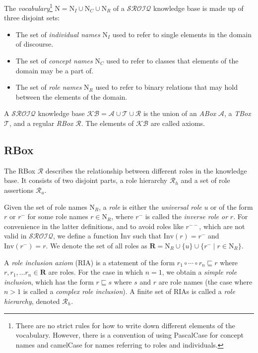 
The \emph{vocabulary}\footnote{There are no strict rules for how to write down different elements of the vocabulary. However, there is a convention of using PascalCase for concept names and camelCase for names referring to roles and individuals.} $\mathrm{N} = \mathrm{N}_I \cup \mathrm{N}_C \cup \mathrm{N}_R$ of a $\mathcal{SROIQ}$ knowledge base is made up of three disjoint sets:

\begin{itemize}
    \item The set of \emph{individual names} $\mathrm{N}_I$ used to refer to single elements in the domain of discourse.
    \item The set of \emph{concept names} $\mathrm{N}_C$ used to refer to classes that elements of the domain may be a part of.
    \item The set of \emph{role names} $\mathrm{N}_R$ used to refer to binary relations that may hold between the elements of the domain.
\end{itemize}

A $\mathcal{SROIQ}$ knowledge base $\mathcal{KB} = \mathcal{A} \cup \mathcal{T} \cup \mathcal{R}$ is the union of an \emph{ABox} $\mathcal{A}$, a \emph{TBox} $\mathcal{T}$, and a regular \emph{RBox} $\mathcal{R}$. The elements of $\mathcal{KB}$ are called axioms.

\subsection{RBox} \label{rbox}

The RBox $\mathcal{R}$ describes the relationship between different roles in the knowledge base. It consists of two disjoint parts, a role hierarchy $\mathcal{R}_h$ and a set of role assertions $\mathcal{R}_a$.

Given the set of role names $\mathrm{N}_R$, a \emph{role} is either the \emph{universal role} $u$ or of the form $r$ or $r^-$ for some role names $r \in \mathrm{N}_R$, where $r^-$ is called the \emph{inverse role or} $r$. For convenience in the latter definitions, and to avoid roles like $r^{--}$, which are not valid in $\mathcal{SROIQ}$, we define a function $\mathrm{Inv}$ such that $\mathrm{Inv}(r) = r^-$ and $\mathrm{Inv}(r^-) = r$. We denote the set of all roles as $\mathbf{R} = \mathrm{N}_R \cup \{ u \} \cup \{ r^- \mid r \in \mathrm{N}_R \}$.

A \emph{role inclusion axiom} (RIA) is a statement of the form $r_1 \circ \cdots \circ r_n \sqsubseteq r$ where $r, r_1, \dots r_n \in \mathbf{R}$ are roles. For the case in which $n = 1$, we obtain a \emph{simple role inclusion}, which has the form $r \sqsubseteq s$ where $s$ and $r$ are role names (the case where $n > 1$ is called a \emph{complex role inclusion}). A finite set of RIAs is called a \emph{role hierarchy}, denoted $\mathcal{R}_h$.

